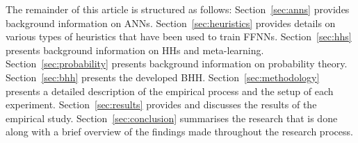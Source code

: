 The remainder of this article is structured as follows: Section~\ref{sec:anns} provides background information on \acp{ANN}. Section~\ref{sec:heuristics} provides details on various types of heuristics that have been used to train \acp{FFNN}. Section~\ref{sec:hhs} presents background information on \acp{HH} and meta-learning. Section~\ref{sec:probability} presents background information on probability theory. Section~\ref{sec:bhh} presents the developed \Acs{BHH}. Section~\ref{sec:methodology} presents a detailed description of the empirical process and the setup of each experiment. Section~\ref{sec:results} provides and discusses the results of the empirical study. Section~\ref{sec:conclusion} summarises the research that is done along with a brief overview of the findings made throughout the research process.
